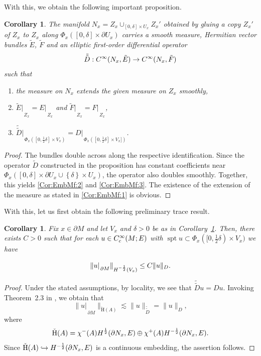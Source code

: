\documentclass[a4paper,10pt,reqno]{amsart}
\newcommand{\rest}[1]{{{\lvert_{}}_{}}_{#1}}
\newcommand{\dbrac}[1]{\left\{#1\right\}}
\newcommand{\dtilde}[1]{\tilde{\tilde{#1}}}%
\newcommand{\norm}[1]{\| #1 \|}%
\newcommand{\set}[1]{\dbrac{#1}}
\newcommand{\Ck}[2][{}]{{\rm C}^{#2}_{\rm #1}}%
\newcommand{\Hard}[2][{}]{{\rm H}^{#2}_{\rm #1}}%
\newcommand{\SobH}[2][{}]{\Hard[#1]{\rm #2}}
\newcommand{\checkH}{\check{\mathrm{H}}}
\newcommand{\union}{\cup}
\DeclareMathOperator{\spt}{spt}%
\newcommand{\embeds}{\hookrightarrow}%
\newtheorem{corollary}[theorem]{Corollary}
\theoremstyle{definition}
\begin{document}
With this, we obtain the following important proposition.

\begin{corollary}
\label{Cor:EmbMf}
The manifold $N_x = Z_x\cup_{[0,\delta]\times U_x} Z_x'$ obtained by gluing a copy $Z_x'$ of $Z_x$ to $Z_x$ along $\Phi_x([0,\delta]\times \partial U_x)$ carries a smooth measure, Hermitian vector bundles $\tilde{E}$, $\tilde{F}$ and an elliptic first-order differential operator
$$
\dtilde{D}: \Ck{\infty}(N_x, \tilde{E}) \to \Ck{\infty}(N_x, \tilde{F})
$$
such that
\begin{enumerate}[label=(\roman*), labelwidth=0pt, labelindent=2pt, leftmargin=21pt]
\item\label{Cor:EmbMf:1}
the measure on $N_x$ extends the given measure on $Z_x$ smoothly,
\item \label{Cor:EmbMf:2}
      $\tilde{E}\rest{Z_x}=E\rest{Z_x}$ and $\tilde{F}\rest{Z_x}=F\rest{Z_x}$,
      \item\label{Cor:EmbMf:3}
      $\dtilde{D}\rest{\Phi_x([0, \frac12\delta] \times V_x)} = D\rest{\Phi_x([0,\frac12\delta] \times V_x])}$.
\end{enumerate}
\end{corollary}
\begin{proof}
The bundles double across along the respective identification.
Since the operator $\tilde{D}$ constructed in the proposition has constant coefficients near $\Phi_x([0, \delta] \times \partial U_x \union \set{\delta} \times U_x)$, the operator also doubles smoothly.
Together, this yields \ref{Cor:EmbMf:2} and \ref{Cor:EmbMf:3}.
The existence of the extension of the measure as stated in \ref{Cor:EmbMf:1} is obvious.
\end{proof}


With this, let us first obtain the following preliminary trace result.

\begin{corollary}
\label{Cor:Trace0}
Fix $x \in \partial M$ and let $V_x$ and $\delta > 0$ be as in Corollary~\ref{Cor:EmbMf}.
Then, there exists $C > 0$ such that for each $u \in \Ck[c]{\infty}(M;E)$ with $\spt u \subset \Phi_x([0, \frac12 \delta ) \times V_x)$ we have

$$
\norm{u\rest{\partial M}}_{\SobH{-\frac12}(V_x)} \leq C \norm{u}_{D}.$$
\end{corollary}
\begin{proof}
Under the stated assumptions, by locality, we see that $\dtilde{D}u = Du$.
Invoking Theorem~2.3 in \cite{BBan}, we obtain that
$$ \norm{u\rest{\partial M}}_{\checkH(A)}  \lesssim \norm{u}_{\dtilde{D}} = \norm{u}_{D},$$
where
$$ \checkH(A) = \chi^-(A)\SobH{\frac12}(\partial N_x,E) \oplus \chi^+(A)\SobH{-\frac12}(\partial N_x, E).$$
Since $\checkH(A) \embeds \SobH{-\frac12}(\partial N_x,E)$ is a continuous embedding, the assertion follows.
\end{proof}
\end{document}
